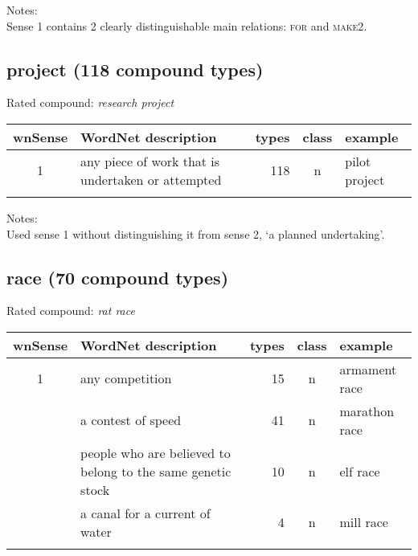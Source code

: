 \noindent
Notes:\\
Sense 1 contains 2 clearly distinguishable main relations: \textsc{for} and \textsc{make2}.
\subsection{project   (118 compound types)}
Rated compound: \emph{research project}


\vspace*{-.2cm}

\noindent
\begin{longtable}{c>{\raggedright\arraybackslash}p{5cm}rc>{\raggedright\arraybackslash}p{2cm}}\lsptoprule
{\small wnSense}&WordNet description&types&class&example\\\midrule
1&any piece of work that is undertaken or attempted&118&n&pilot project\\\lspbottomrule
\end{longtable}
\vspace*{-.2cm}

\noindent
Notes:\\
Used sense 1 without distinguishing it from sense 2, `a planned undertaking'.

\subsection{race      (70 compound types)}
Rated compound: \emph{rat race}
\vspace*{-.2cm}



\noindent
\begin{longtable}{c>{\raggedright\arraybackslash}p{5cm}rc>{\raggedright\arraybackslash}p{2cm}}\lsptoprule
{\small wnSense}&WordNet description&types&class&example\\\midrule
1&any competition&15&n&armament race\\\tablevspace
2&a contest of speed&41&n&marathon race\\\tablevspace
3&people who are believed to belong to the same genetic stock&10&n&elf race\\\tablevspace
6&a canal for a current of water&4&n&mill race\\\lspbottomrule
\end{longtable}
